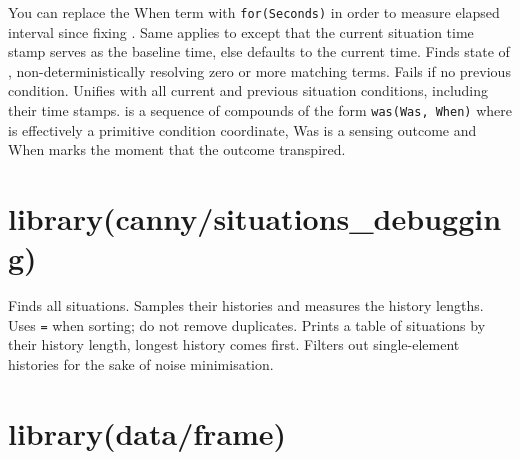 \begin{description}
\begin{description}
You can replace the When term with \verb$for(Seconds)$ in order to
measure elapsed interval since fixing . Same applies to
 except that the current situation time stamp serves
as the baseline time, else defaults to the current time.
Finds  state of , non-deterministically
resolving zero or more matching  terms. Fails if no
previous  condition.
Unifies  with all current and previous situation
conditions, including their time stamps.  is a sequence
of compounds of the form \verb$was(Was, When)$ where  is
effectively a primitive condition coordinate, Was is a sensing
outcome and When marks the moment that the outcome transpired.
\end{description}
\end{description}

\chapter{library(canny/situations_debugging)}\label{sec:situationsdebugging}

\begin{description}
Finds all situations. Samples their histories and measures the
history lengths. Uses \verb$=$ when sorting; do not remove duplicates.
Prints a table of situations by their history length, longest
history comes first. Filters out single-element histories for the
sake of noise minimisation.
\end{description}

\chapter{library(data/frame)}\label{sec:frame}

